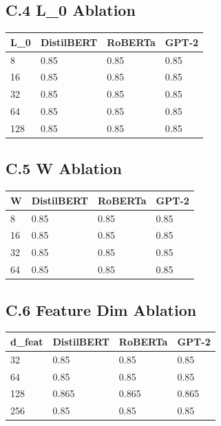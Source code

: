 \subsection{C.4 L\_0 Ablation}

\begin{table}[H]
\centering
\small
\begin{tabular}{llll}
\toprule
\textbf{L\_0} & \textbf{DistilBERT} & \textbf{RoBERTa} & \textbf{GPT-2} \\
\midrule
8 & 0.85 & 0.85 & 0.85 \\
16 & 0.85 & 0.85 & 0.85 \\
32 & 0.85 & 0.85 & 0.85 \\
64 & 0.85 & 0.85 & 0.85 \\
128 & 0.85 & 0.85 & 0.85 \\
\bottomrule
\end{tabular}
\end{table}

\subsection{C.5 W Ablation}

\begin{table}[H]
\centering
\small
\begin{tabular}{llll}
\toprule
\textbf{W} & \textbf{DistilBERT} & \textbf{RoBERTa} & \textbf{GPT-2} \\
\midrule
8 & 0.85 & 0.85 & 0.85 \\
16 & 0.85 & 0.85 & 0.85 \\
32 & 0.85 & 0.85 & 0.85 \\
64 & 0.85 & 0.85 & 0.85 \\
\bottomrule
\end{tabular}
\end{table}

\subsection{C.6 Feature Dim Ablation}

\begin{table}[H]
\centering
\small
\begin{tabular}{llll}
\toprule
\textbf{d\_feat} & \textbf{DistilBERT} & \textbf{RoBERTa} & \textbf{GPT-2} \\
\midrule
32 & 0.85 & 0.85 & 0.85 \\
64 & 0.85 & 0.85 & 0.85 \\
128 & 0.865 & 0.865 & 0.865 \\
256 & 0.85 & 0.85 & 0.85 \\
\bottomrule
\end{tabular}
\end{table}

